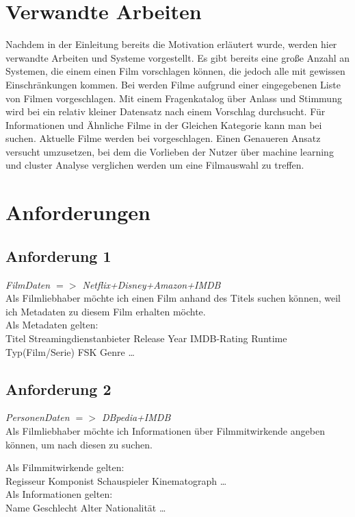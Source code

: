 \documentclass[conference]{IEEEtran}
\begin{document}
\section{Verwandte Arbeiten}

Nachdem in der Einleitung bereits die Motivation erläutert wurde, werden hier verwandte Arbeiten und Systeme vorgestellt.
Es gibt bereits eine große Anzahl an Systemen, die einem einen Film vorschlagen können, die jedoch alle mit gewissen Einschränkungen kommen.
Bei \cite{cinemate} werden Filme aufgrund einer eingegebenen Liste von Filmen vorgeschlagen.
Mit einem Fragenkatalog über Anlass und Stimmung wird bei \cite{pickamovieforme} ein relativ kleiner Datensatz nach einem Vorschlag durchsucht.
Für Informationen und Ähnliche Filme in der Gleichen Kategorie kann man bei \cite{bestsimilar} suchen.
Aktuelle Filme werden bei \cite{tastedive} vorgeschlagen.
Einen Genaueren Ansatz versucht \cite{MovieGEN} umzusetzen, bei dem die Vorlieben der Nutzer über machine learning und cluster Analyse verglichen werden um eine Filmauswahl zu treffen.

\section{Anforderungen}

\subsection{Anforderung 1}
\textit{FilmDaten $=>$ Netflix+Disney+Amazon+IMDB}
\\
Als Filmliebhaber möchte ich einen Film anhand des Titels suchen können,
weil ich Metadaten zu diesem Film erhalten möchte.
\\
Als Metadaten gelten:
\\
Titel
Streamingdienstanbieter
Release Year
IMDB-Rating
Runtime
Typ(Film/Serie)
FSK
Genre
\dots


\subsection{Anforderung 2}
\textit{PersonenDaten $=>$ DBpedia+IMDB}
\\
Als Filmliebhaber möchte ich Informationen über Filmmitwirkende angeben können,
um nach diesen zu suchen.

Als Filmmitwirkende gelten:
\\
Regisseur
Komponist
Schauspieler
Kinematograph
\dots
\\
Als Informationen gelten:
\\
Name
Geschlecht
Alter
Nationalität
\dots
\\
\end{document}
